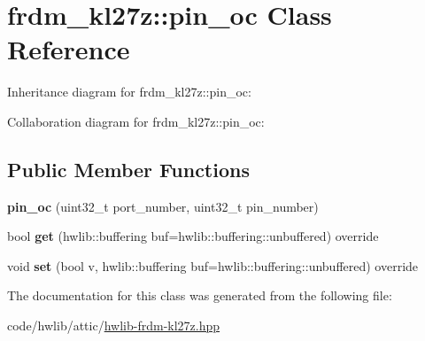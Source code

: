 \hypertarget{classfrdm__kl27z_1_1pin__oc}{}\section{frdm\+\_\+kl27z\+:\+:pin\+\_\+oc Class Reference}
\label{classfrdm__kl27z_1_1pin__oc}


Inheritance diagram for frdm\+\_\+kl27z\+:\+:pin\+\_\+oc\+:


Collaboration diagram for frdm\+\_\+kl27z\+:\+:pin\+\_\+oc\+:
\subsection*{Public Member Functions}
\begin{DoxyCompactItemize}
\item 
\mbox{\label{classfrdm__kl27z_1_1pin__oc_a60afba6a2edbc0f4d4059577b189fbc2}} 
{\bfseries pin\+\_\+oc} (uint32\+\_\+t port\+\_\+number, uint32\+\_\+t pin\+\_\+number)
\item 
\mbox{\label{classfrdm__kl27z_1_1pin__oc_a73ff95a596054bc313a67e09ad4b4193}} 
bool {\bfseries get} (hwlib\+::buffering buf=hwlib\+::buffering\+::unbuffered) override
\item 
\mbox{\label{classfrdm__kl27z_1_1pin__oc_a8d773707105bbb6900b4c03429bde215}} 
void {\bfseries set} (bool v, hwlib\+::buffering buf=hwlib\+::buffering\+::unbuffered) override
\end{DoxyCompactItemize}


The documentation for this class was generated from the following file\+:\begin{DoxyCompactItemize}
\item 
code/hwlib/attic/\hyperlink{hwlib-frdm-kl27z_8hpp}{hwlib-\/frdm-\/kl27z.\+hpp}\end{DoxyCompactItemize}
